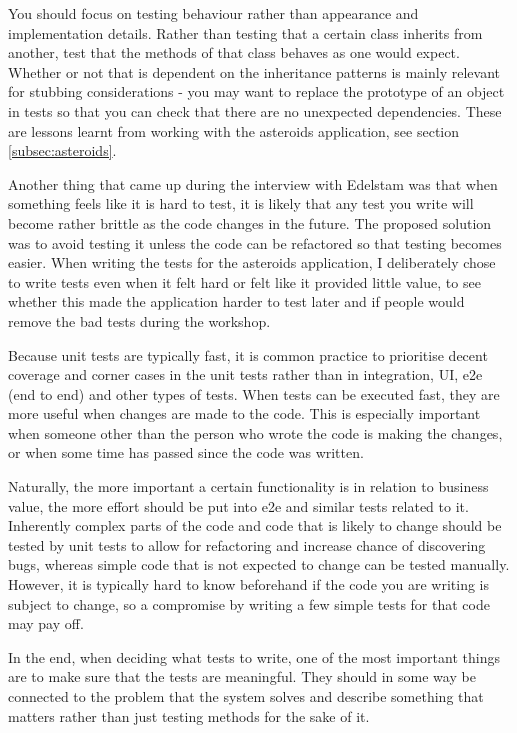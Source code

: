 \documentclass[11pt]{article}
\begin{document}
You should focus on testing behaviour rather than appearance and implementation details. \cite[question~10]{Edelstam} Rather than testing that a certain class inherits from another, test that the methods of that class behaves as one would expect. Whether or not that is dependent on the inheritance patterns is mainly relevant for stubbing considerations - you may want to replace the prototype of an object in tests so that you can check that there are no unexpected dependencies. These are lessons learnt from working with the asteroids application, see section \ref{subsec:asteroids}. 

Another thing that came up during the interview with Edelstam was that when something feels like it is hard to test, it is likely that any test you write will become rather brittle as the code changes in the future. The proposed solution was to avoid testing it unless the code can be refactored so that testing becomes easier. \cite[question~30]{Edelstam} When writing the tests for the asteroids application, I deliberately chose to write tests even when it felt hard or felt like it provided little value, to see whether this made the application harder to test later and if people would remove the bad tests during the workshop.

Because unit tests are typically fast, it is common practice to prioritise decent coverage and corner cases in the unit tests rather than in integration, UI, e2e (end to end) and other types of tests. When tests can be executed fast, they are more useful when changes are made to the code. This is especially important when someone other than the person who wrote the code is making the changes, or when some time has passed since the code was written. \cite[questions~22-24]{Stenmark}

Naturally, the more important a certain functionality is in relation to business value, the more effort should be put into e2e and similar tests related to it. Inherently complex parts of the code and code that is likely to change should be tested by unit tests to allow for refactoring and increase chance of discovering bugs, whereas simple code that is not expected to change can be tested manually. However, it is typically hard to know beforehand if the code you are writing is subject to change, so a compromise by writing a few simple tests for that code may pay off. \cite[questions~28-29 and 33]{Stenmark}

In the end, when deciding what tests to write, one of the most important things are to make sure that the tests are meaningful. They should in some way be connected to the problem that the system solves and describe something that matters rather than just testing methods for the sake of it. \cite[questions~17-18]{Ahnve}
\end{document}
